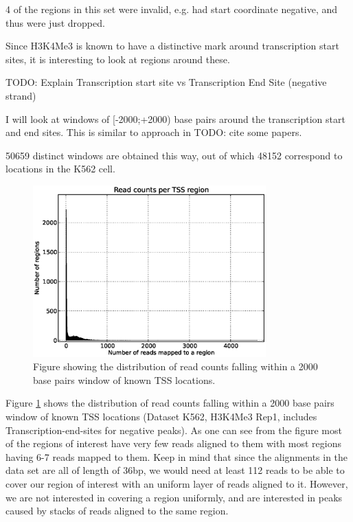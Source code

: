 \documentclass[10pt,a4paper]{article}
\begin{document}
4 of the regions in this set were invalid, e.g. had start coordinate negative, and thus were just dropped.

Since H3K4Me3 is known to have a distinctive mark around transcription start sites, it is interesting to look at regions around these.

TODO: Explain Transcription start site vs Transcription End Site (negative strand)

I will look at windows of [-2000;+2000) base pairs around the transcription start and end sites. This is similar to approach in TODO: cite some papers.

50659 distinct windows are obtained this way, out of which 48152 correspond to locations in the K562 cell.


\begin{figure}
\centering
\includegraphics[width=0.8\textwidth]{images/read_counts_per_tss_region.eps}
\caption{Figure showing the distribution of read counts falling within a 2000 base pairs window of known TSS locations.}
\label{fig:read_counts_per_tss_region}
\end{figure}

Figure \ref{fig:read_counts_per_tss_region} shows the distribution of read counts falling within a 2000 base pairs window of known TSS locations (Dataset K562, H3K4Me3 Rep1, includes Transcription-end-sites for negative peaks). As one can see from the figure most of the regions of interest have very few reads aligned to them with most regions having 6-7 reads mapped to them. Keep in mind that since the alignments in the data set are all of length of 36bp, we would need at least 112 reads to be able to cover our region of interest with an uniform layer of reads aligned to it. However, we are not interested in covering a region uniformly, and are interested in peaks caused by stacks of reads aligned to the same region.
\end{document}
